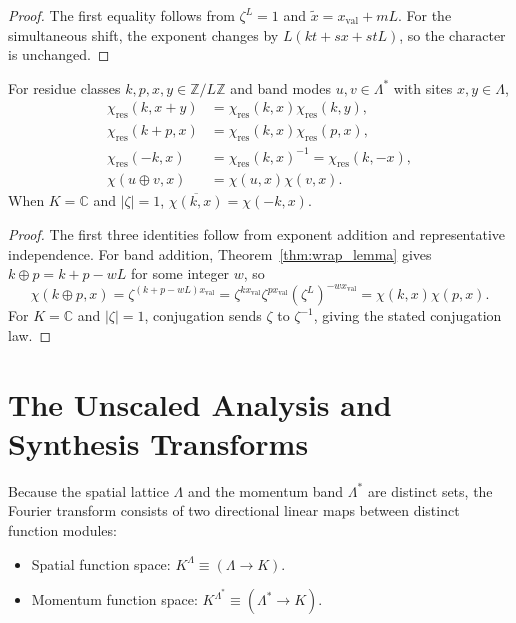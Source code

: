 \begin{proof}
The first equality follows from $\zeta^L=1$ and $\widetilde{x}=x_{\mathrm{val}}+mL$. For the simultaneous shift, the exponent changes by $L(kt+sx+stL)$, so the character is unchanged.
\end{proof}

\begin{theorem}
\label{thm:character_homomorphisms}
For residue classes $k,p,x,y\in\mathbb Z/L\mathbb Z$ and band modes $u,v\in\Lambda^*$ with sites $x,y\in\Lambda$,
\begin{align}
\chi_{\mathrm{res}}(k,x+y)&=\chi_{\mathrm{res}}(k,x)\chi_{\mathrm{res}}(k,y),\\
\chi_{\mathrm{res}}(k+p,x)&=\chi_{\mathrm{res}}(k,x)\chi_{\mathrm{res}}(p,x),\\
\chi_{\mathrm{res}}(-k,x)&=\chi_{\mathrm{res}}(k,x)^{-1}=\chi_{\mathrm{res}}(k,-x),\\
\chi(u\oplus v,x)&=\chi(u,x)\chi(v,x).
\end{align}
When $K=\mathbb C$ and $|\zeta|=1$, $\overline{\chi(k,x)}=\chi(-k,x)$.
\end{theorem}

\begin{proof}
The first three identities follow from exponent addition and representative independence. For band addition, Theorem~\ref{thm:wrap_lemma} gives $k\oplus p=k+p-wL$ for some integer $w$, so
\begin{equation}
\chi(k\oplus p,x)=\zeta^{(k+p-wL)x_{\mathrm{val}}}
=\zeta^{kx_{\mathrm{val}}}\zeta^{px_{\mathrm{val}}}(\zeta^L)^{-wx_{\mathrm{val}}}
=\chi(k,x)\chi(p,x).
\end{equation}
For $K=\mathbb C$ and $|\zeta|=1$, conjugation sends $\zeta$ to $\zeta^{-1}$, giving the stated conjugation law.
\end{proof}

\section{The Unscaled Analysis and Synthesis Transforms}

Because the spatial lattice $\Lambda$ and the momentum band $\Lambda^*$ are distinct sets, the Fourier transform consists of two directional linear maps between distinct function modules:
\begin{itemize}
    \item Spatial function space: $K^\Lambda \equiv (\Lambda \to K)$.
    \item Momentum function space: $K^{\Lambda^*} \equiv (\Lambda^* \to K)$.
\end{itemize}

